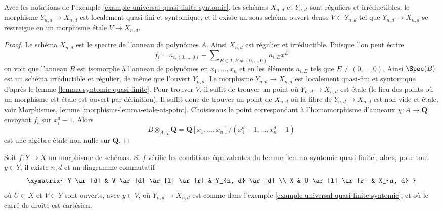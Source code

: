 \begin{lemma}
\label{lemma-universal-quasi-finite-syntomic-etale}
Avec les notations de l'exemple \ref{example-universal-quasi-finite-syntomic},
les schémas $X_{n, d}$ et $Y_{n, d}$ sont réguliers et irréductibles,
le morphisme $Y_{n, d} \to X_{n, d}$ est localement quasi-fini et
syntomique, et il existe un sous-schéma ouvert dense $V \subset Y_{n, d}$
tel que $Y_{n, d} \to X_{n, d}$ se restreigne en un morphisme étale
$V \to X_{n, d}$.
\end{lemma}

\begin{proof}
Le schéma $X_{n, d}$ est le spectre de l'anneau de polynômes $A$.
Ainsi $X_{n, d}$ est régulier et irréductible. Puisque l'on peut écrire
$$
f_i = a_{i, (0, \ldots, 0)} +
\sum\nolimits_{E \in T, E \not = (0, \ldots, 0)} a_{i, E} x^E
$$
on voit que l'anneau $B$ est isomorphe à l'anneau de polynômes
en $x_1, \ldots, x_n$ et en les éléments $a_{i, E}$ tels que
$E \not = (0, \ldots, 0)$. Ainsi $\Spec(B)$ est un schéma irréductible et
régulier, de même que l'ouvert $Y_{n, d}$. Le morphisme
$Y_{n, d} \to X_{n, d}$ est localement quasi-fini et syntomique d'après le
lemme \ref{lemma-syntomic-quasi-finite}. Pour trouver $V$, il suffit
de trouver un point où $Y_{n, d} \to X_{n, d}$ est étale
(le lieu des points où un morphisme est étale est ouvert par
définition). Il suffit donc de trouver un point de $X_{n, d}$
où la fibre de $Y_{n, d} \to X_{n, d}$ est non vide et étale, voir
Morphismes, lemme \ref{morphisms-lemma-etale-at-point}. Choisissons
le point correspondant à l'homomorphisme d'anneaux $\chi : A \to \mathbf{Q}$
envoyant $f_i$ sur $x_i^d - 1$. Alors
$$
B \otimes_{A, \chi} \mathbf{Q} =
\mathbf{Q}[x_1, \ldots, x_n]/(x_1^d - 1, \ldots, x_n^d - 1)
$$
est une algèbre étale non nulle sur $\mathbf{Q}$.
\end{proof}

\begin{lemma}
\label{lemma-locally-comes-from-universal}
Soit $f : Y \to X$ un morphisme de schémas. Si $f$ vérifie les conditions équivalentes
du lemme \ref{lemma-syntomic-quasi-finite}, alors, pour tout
$y \in Y$, il existe $n, d$ et un diagramme commutatif
$$
\xymatrix{
Y \ar[d] &
V \ar[d] \ar[l] \ar[r] &
Y_{n, d} \ar[d] \\
X & U \ar[l] \ar[r] &
X_{n, d}
}
$$
où $U \subset X$ et $V \subset Y$ sont ouverts, avec $y \in V$,
où $Y_{n, d} \to X_{n, d}$
est comme dans l'exemple \ref{example-universal-quasi-finite-syntomic}, et
où le carré de droite est cartésien.
\end{lemma}

